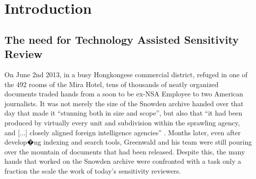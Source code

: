 \documentclass{l4proj}
\begin{document}
\tableofcontents

%
%
%
%
%
%
%
%



\chapter{Introduction}


\section{The need for Technology Assisted Sensitivity Review}

On June 2nd 2013, in a busy Hongkongese commercial district, refuged in one of the 492 rooms of the Mira Hotel, tens of thousands of neatly organized documents traded hands from a soon to be ex-NSA Employee to two American journalists.
It was not merely the size of the Snowden archive handed over that day that made it ``stunning both in size and scope'', but also that ``it had been produced by virtually every unit and subdivision within the sprawling agency, and [...] closely aligned foreign intelligence agencies'' \autocite[77]{greenwaldNoPlaceHide2014}.
Months later, even after develop�ng indexing and search tools, Greenwald and his team were still pouring over the mountain of documents that had been released.
Despite this, the many hands that worked on the Snowden archive were confronted with a task only a fraction the scale the work of today's sensitivity reviewers.
\end{document}
